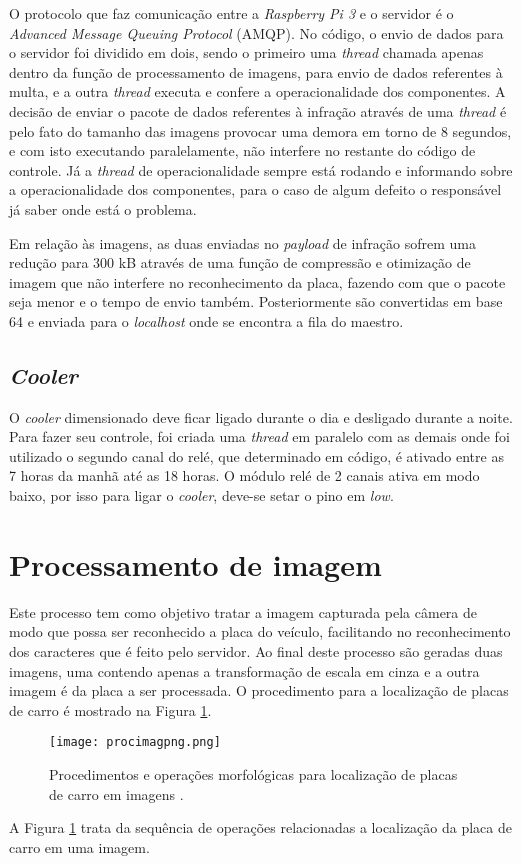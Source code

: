  O protocolo que faz comunicação entre a \emph{Raspberry Pi 3} e o servidor é o \emph{Advanced Message Queuing Protocol} (AMQP). No código, o envio de dados para o servidor foi dividido em dois, sendo o primeiro uma \emph{thread} chamada apenas dentro da função de processamento de imagens, para envio de dados referentes à multa, e a outra \emph{thread} executa e confere a operacionalidade dos componentes. A decisão de enviar o pacote de dados referentes à infração através de uma \emph{thread} é pelo fato do tamanho das imagens provocar uma demora em torno de 8 segundos, e com isto executando paralelamente, não interfere no restante do código de controle. Já a \emph{thread} de operacionalidade sempre está rodando e informando sobre a operacionalidade dos componentes, para o caso de algum defeito o responsável já saber onde está o problema. \par
 Em relação às imagens, as duas enviadas no \emph{payload} de infração sofrem uma redução para 300 kB através de uma função de compressão e otimização de imagem que não interfere no reconhecimento da placa, fazendo com que o pacote seja menor e o tempo de envio também. Posteriormente são convertidas em base 64 e enviada para o \emph{localhost} onde se encontra a fila do maestro.

\subsection{\emph{Cooler}} 
O \emph{cooler} dimensionado deve ficar ligado durante o dia e desligado durante a noite. Para fazer seu controle, foi criada uma \emph{thread} em paralelo com as demais onde foi utilizado o segundo canal do relé, que determinado em código, é ativado entre as 7 horas da manhã até as 18 horas. O módulo relé de 2 canais ativa em modo baixo, por isso para ligar o \emph{cooler}, deve-se setar o pino em \emph{low}.

\section{Processamento de imagem} \label{procimag}

Este processo tem como objetivo tratar a imagem capturada pela câmera de modo que possa ser reconhecido a placa do veículo, facilitando no reconhecimento dos caracteres que é feito pelo servidor. Ao final deste processo são geradas duas imagens, uma contendo apenas a transformação de escala em cinza e a outra imagem é da placa a ser processada. O procedimento para a localização de placas de carro é mostrado na Figura \ref{fig:proc_img}.
\begin{figure}[H]
    \centering
    \texttt{[image: procimagpng.png]}    \caption{Procedimentos e operações morfológicas para localização de placas de carro em imagens \cite{yepez2018improved}.}
    \label{fig:proc_img}
\end{figure}
A Figura \ref{fig:proc_img} trata da sequência de operações relacionadas a localização da placa de carro em uma imagem. 

